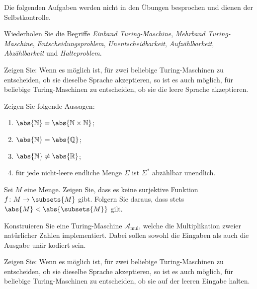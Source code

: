\documentclass[german]{latteachCD}[2017/03/28]
\begin{document}
\maketitle

\begin{mdframed}
  Die folgenden Aufgaben werden nicht in den Übungen besprochen und dienen der
  Selbstkontrolle.

  \renewcommand{\theexercise}{\Alph{exercise}}

  \begin{exercise}
    Wiederholen Sie die Begriffe \emph{Einband Turing-Maschine}, \emph{Mehrband
      Turing-Maschine}, \emph{Entscheidungsproblem}, \emph{Unentscheidbarkeit},
    \emph{Aufzählbarkeit}, \emph{Abzählbarkeit} und \emph{Halteproblem}.%
  \end{exercise}

  \begin{exercise}
    Zeigen Sie: Wenn es möglich ist, für zwei beliebige Turing-Maschinen zu
    entscheiden, ob sie dieselbe Sprache akzeptieren, so ist es auch möglich,
    für beliebige Turing-Maschinen zu entscheiden, ob sie die leere Sprache
    akzeptieren.
  \end{exercise}

\end{mdframed}

\vspace*{\baselineskip}

\setcounter{exercise}{0}

\begin{exercise}
  Zeigen Sie folgende Aussagen:
  \begin{enumerate}
  \item $\abs{\mathbb N} = \abs{\mathbb N \times \mathbb N}$;
  \item $\abs{\mathbb N} = \abs{\mathbb Q}$;
  \item $\abs{\mathbb N} \neq \abs{\mathbb R}$;
  \item für jede nicht-leere endliche Menge $\Sigma$ ist $\Sigma^{*}$ abzählbar
    unendlich.
  \end{enumerate}
\end{exercise}

\begin{exercise}
  Sei $M$ eine Menge.  Zeigen Sie, dass es keine surjektive Funktion $f \colon M
  \to \subsets{M}$ gibt.  Folgern Sie daraus, dass stets $\abs{M} <
  \abs{\subsets{M}}$ gilt.
\end{exercise}

\begin{exercise}
  Konstruieren Sie eine Turing-Maschine $\mathcal{A}_{\text{mul}}$, welche die
  Multiplikation zweier natürlicher Zahlen implementiert.  Dabei sollen sowohl
  die Eingaben als auch die Ausgabe unär kodiert sein.
\end{exercise}

\begin{exercise}
  Zeigen Sie: Wenn es möglich ist, für zwei beliebige Turing-Maschinen zu
  entscheiden, ob sie dieselbe Sprache akzeptieren, so ist es auch möglich, für
  beliebige Turing-Maschinen zu entscheiden, ob sie auf der leeren Eingabe
  halten.
\end{exercise}
\end{document}
